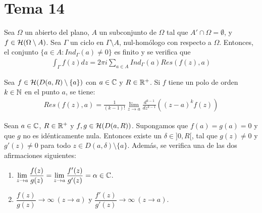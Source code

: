 \documentclass[12pt]{article}
\begin{document}
    \newpage

    \section{Tema 14}

    \begin{teo}
        Sea $\Omega$ un abierto del plano, $A$ un subconjunto de $\Omega$ tal que $A'\cap \Omega = \emptyset$, y $f\in \mathcal{H}(\Omega \setminus A)$. Sea $\Gamma$ un ciclo en $\Gamma \setminus A$, nul-homólogo con respecto a $\Omega$. Entonces, el conjunto $\{a\in A : Ind_\Gamma(a)\neq 0\}$ es finito y se verifica que
        \begin{gather*}
            \int_\Gamma f(z)dz = 2\pi i \sum\limits_{a\in A} Ind_\Gamma (a) Res(f(z), a)
        \end{gather*}
    \end{teo}

    \begin{prop}
        Sea $f\in\mathcal{H}(D(a,R)\setminus\{a\})$ con $a\in \mathbb{C}$ y $R\in \mathbb{R}^+$. Si $f$ tiene un polo de orden $k\in \mathbb{N}$ en el punto $a$, se tiene:
        \begin{gather*}
            Res(f(z),a) = \frac{1}{(k-1)!} \lim_{z\to a} \frac{d^{k-1}}{dz^{k-1}} ((z-a)^k f(z))
        \end{gather*}
    \end{prop}

    \begin{teo} Sean $a\in \mathbb{C}$, $R\in \mathbb{R}^+$ y $f,g\in \mathcal{H}(D(a, R))$. Supongamos que $f(a)=g(a)=0$ y que $g$ no es idénticamente nula. Entonces existe un $\delta \in ]0,R[$, tal que $g(z)\neq 0$ y $g'(z)\neq 0$ para todo $z\in D(a, \delta)\setminus \{a\}$. Además, se verifica una de las dos afirmaciones siguientes:
    \begin{enumerate}
        \item $\displaystyle \lim\limits_{z\to a} \frac{f(z)}{g(z)} = \lim\limits_{z\to a} \frac{f'(z)}{g'(z)} = \alpha \in \mathbb{C}$.
        \item $\dfrac{f(z)}{g(z)} \to \infty\  (z \to a)$ y $\dfrac{f'(z)}{g'(z)} \to \infty\ (z \to a)$.
    \end{enumerate}
        
    \end{teo}

    \newpage
\end{document}
